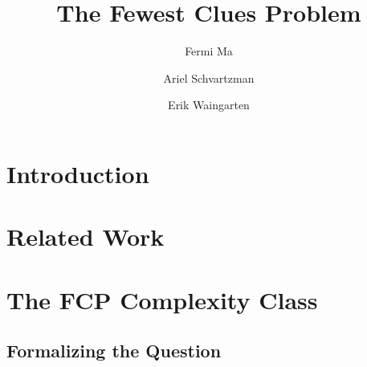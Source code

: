 \documentclass[runningheads,a4paper]{llncs}
\begin{document}
\mainmatter  %

\title{The Fewest Clues Problem}


%
%
\author{Fermi Ma \and Ariel Schvartzman \and Erik Waingarten}
%


%
%

\maketitle

\section{Introduction}
\label{sec:introduction}

\section{Related Work}
\label{sec:relatedwork}

\section{The FCP Complexity Class}
\label{sec:complexityclass}

\subsection{Formalizing the Question}
\end{document}
